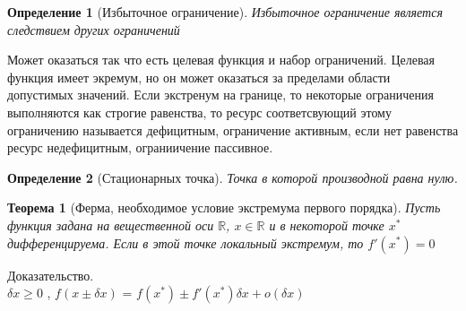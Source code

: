 \documentclass[14pt]{extarticle}
\newtheorem{theorem}{Теорема}
\newtheorem{definition}{Определение}
\begin{document}
\begin{definition}[Избыточное ограничение]
	Избыточное ограничение является следствием других ограничений
\end{definition}
Может оказаться так что есть целевая функция и набор ограничений. Целевая
функция имеет экремум, но он может оказаться за пределами области
допустимых значений. Если экстренум на границе, то некоторые
ограничения выполняются как строгие равенства, то ресурс соответсвующий
этому ограничению называется дефицитным, ограничение активным,
если нет равенства ресурс недефицитным, ограниичение пассивное.
\begin{definition}[Стационарных точка]
	Точка в которой производной равна нулю.
\end{definition}
\begin{theorem}[Ферма, необходимое условие экстремума первого порядка]
	Пусть функция задана на вещественной оси $\mathbb{R}$,
	$x \in \mathbb{R}$  и в некоторой точке $x^{*}$ дифференцируема.
	Если в этой точке локальный экстремум, то $f'(x^{*}) = 0$
\end{theorem}
Доказательство.\\
$\delta x \ge  0$ , $f(x \pm \delta x)$ =  $f(x^{*}) \pm f'(x^{*}) \delta x + o(\delta x)$
\end{document}

